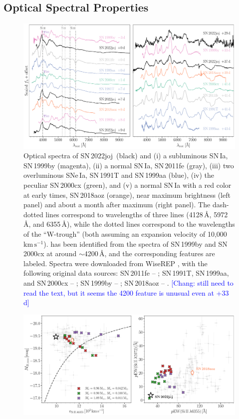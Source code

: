 \documentclass[twocolumn]{aastex631}
\newcommand{\sn}{SN\,2022joj}
\newcommand{\kms}{$\mathrm{km}\,\mathrm{s}^{-1}$}
\newcommand{\chang}[1]{\textcolor{blue}{[Chang: #1]}}
\begin{document}
\begin{CJK*}{UTF8}{gbsn}
\subsection{Optical Spectral Properties} \label{sec:analysis_spec}
\begin{figure}
    \centering
    \includegraphics[width=\linewidth]{spec_comp.pdf}
    \caption{Optical spectra of \sn\ (black) and (i) a subluminous SN\,Ia, SN\,1999by (magenta), (ii) a normal SN\,Ia, SN\,2011fe (gray), (iii) two overluminous SNe\,Ia, SN\,1991T and SN\,1999aa (blue), (iv) the peculiar SN\,2000cx (green), and (v) a normal SN\,Ia with a red color at early times, SN\,2018aoz (orange), near maximum brightness (left panel) and about a month after maximum (right panel). The dash-dotted lines correspond to wavelengths of three  lines (4128\,\r{A}, 5972\,\r{A}, and 6355\,\r{A}), while the dotted lines correspond to the wavelengths of the  ``W-trough'' (both assuming an expansion velocity of 10,000\,\kms).  has been identified from the spectra of SN\,1999by and SN\,2000cx at around $\sim$4200\,\r{A}, and the corresponding features are labeled. Spectra were downloaded from WiseREP  \citep{wiserep_2012}, with the following original data sources: SN\,2011fe -- \citet{Pereira_2013, Mazzali_2014}; SN\,1991T, SN\,1999aa, and SN\,2000cx -- \citet{Silverman_UCBIa_2012}; SN\,1999by -- \citet{Matheson_cfaIa_2008}; SN\,2018aoz -- \citet{Ni_18aoz_2023}. \chang{still need to read the text, but it seems the 4200 feature is unusual even at +33 d}}
    \label{fig:spec_comp}
\end{figure}
\begin{figure}
    \centering
    \includegraphics[width=\linewidth]{phase_space.pdf}

\end{figure}
\end{CJK*}
\end{document}
